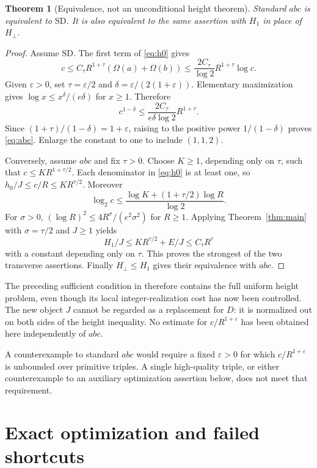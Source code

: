 \documentclass[11pt]{article}
\newtheorem{theorem}{Theorem}[section]
\theoremstyle{definition}
\theoremstyle{remark}
\newcommand{\Om}{\Omega}
\begin{document}
\begin{theorem}[Equivalence, not an unconditional height theorem]\label{thm:equiv}
Standard $abc$ is equivalent to $\mathrm{SD}$. It is also equivalent to the same assertion with $H_1$ in place of $H_\perp$.
\end{theorem}
\begin{proof}
Assume $\mathrm{SD}$. The first term of \eqref{eq:h0} gives
\[
 c\le C_\tau R^{1+\tau}(\Om(a)+\Om(b))
 \le\frac{2C_\tau}{\log2}R^{1+\tau}\log c.
\]
Given $\varepsilon>0$, set $\tau=\varepsilon/2$ and $\delta=\varepsilon/(2(1+\varepsilon))$. Elementary maximization gives $\log x\le x^\delta/(e\delta)$ for $x\ge1$. Therefore
\[
 c^{1-\delta}\le\frac{2C_\tau}{e\delta\log2}R^{1+\tau}.
\]
Since $(1+\tau)/(1-\delta)=1+\varepsilon$, raising to the positive power $1/(1-\delta)$ proves \eqref{eq:abc}. Enlarge the constant to one to include $(1,1,2)$.

Conversely, assume $abc$ and fix $\tau>0$. Choose $K\ge1$, depending only on $\tau$, such that $c\le K R^{1+\tau/2}$. Each denominator in \eqref{eq:h0} is at least one, so $h_0/J\le c/R\le K R^{\tau/2}$. Moreover
\[
 \log_2c\le\frac{\log K+(1+\tau/2)\log R}{\log2}.
\]
For $\sigma>0$, $(\log R)^2\le4R^\sigma/(e^2\sigma^2)$ for $R\ge1$. Applying Theorem~\ref{thm:main} with $\sigma=\tau/2$ and $J\ge1$ yields
\[
 H_1/J\le K R^{\tau/2}+E/J\le C_\tau R^\tau
\]
with a constant depending only on $\tau$. This proves the strongest of the two transverse assertions. Finally $H_\perp\le H_1$ gives their equivalence with $abc$.
\end{proof}

The preceding sufficient condition in \cite{normalforms} therefore contains the full uniform height problem, even though its local integer-realization cost has now been controlled. The new object $J$ cannot be regarded as a replacement for $D$: it is normalized out on both sides of the height inequality. No estimate for $c/R^{1+\varepsilon}$ has been obtained here independently of $abc$.

A counterexample to standard $abc$ would require a fixed $\varepsilon>0$ for which $c/R^{1+\varepsilon}$ is unbounded over primitive triples. A single high-quality triple, or either counterexample to an auxiliary optimization assertion below, does not meet that requirement.

\section{Exact optimization and failed shortcuts}\label{sec:examples}
\end{document}
